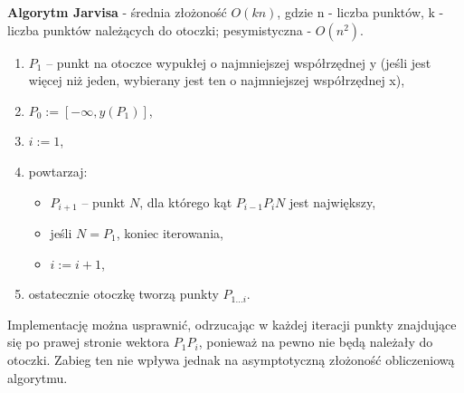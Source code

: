 \documentclass[main.tex]{subfiles}
\begin{document}
    \begin{definition}
        \textbf{Algorytm Jarvisa} - średnia złożoność $O(kn)$, gdzie n - liczba punktów, k - liczba punktów należących do otoczki; pesymistyczna - $O(n^2)$.
        \begin{enumerate}
            \item $P_1$ – punkt na otoczce wypukłej o najmniejszej współrzędnej y (jeśli jest więcej niż jeden, wybierany jest ten o najmniejszej współrzędnej x),
            \item $P_{0}:=[-\infty ,y(P_{1})]$,
            \item $i:=1$,
            \item powtarzaj:
            \begin{itemize}
                \item $P_{i+1}$ – punkt $N$, dla którego kąt $P_{i-1}P_{i}N$ jest największy,
                \item jeśli $N=P_{1}$, koniec iterowania,
                \item $i:=i+1$,
            \end{itemize}
            \item ostatecznie otoczkę tworzą punkty $P_{1\dots i}$.
        \end{enumerate}

        Implementację można usprawnić, odrzucając w każdej iteracji punkty znajdujące się po prawej stronie wektora $P_{1}P_{i}$, ponieważ na pewno nie będą należały do otoczki. Zabieg ten nie wpływa jednak na asymptotyczną złożoność obliczeniową algorytmu.
    \end{definition}
\end{document}
